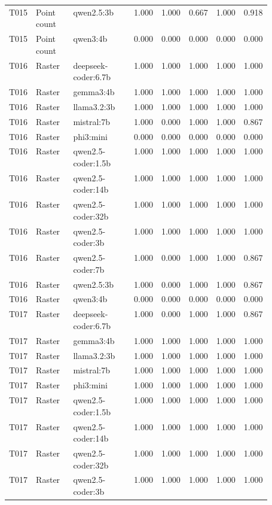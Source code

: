 \begin{longtable}{p{0.08\linewidth}p{0.16\linewidth}p{0.27\linewidth}rrrrr}
T015 & Point count & qwen2.5:3b & 1.000 & 1.000 & 0.667 & 1.000 & 0.918 \\
T015 & Point count & qwen3:4b & 0.000 & 0.000 & 0.000 & 0.000 & 0.000 \\
T016 & Raster & deepseek-coder:6.7b & 1.000 & 1.000 & 1.000 & 1.000 & 1.000 \\
T016 & Raster & gemma3:4b & 1.000 & 1.000 & 1.000 & 1.000 & 1.000 \\
T016 & Raster & llama3.2:3b & 1.000 & 1.000 & 1.000 & 1.000 & 1.000 \\
T016 & Raster & mistral:7b & 1.000 & 0.000 & 1.000 & 1.000 & 0.867 \\
T016 & Raster & phi3:mini & 0.000 & 0.000 & 0.000 & 0.000 & 0.000 \\
T016 & Raster & qwen2.5-coder:1.5b & 1.000 & 1.000 & 1.000 & 1.000 & 1.000 \\
T016 & Raster & qwen2.5-coder:14b & 1.000 & 1.000 & 1.000 & 1.000 & 1.000 \\
T016 & Raster & qwen2.5-coder:32b & 1.000 & 1.000 & 1.000 & 1.000 & 1.000 \\
T016 & Raster & qwen2.5-coder:3b & 1.000 & 1.000 & 1.000 & 1.000 & 1.000 \\
T016 & Raster & qwen2.5-coder:7b & 1.000 & 0.000 & 1.000 & 1.000 & 0.867 \\
T016 & Raster & qwen2.5:3b & 1.000 & 0.000 & 1.000 & 1.000 & 0.867 \\
T016 & Raster & qwen3:4b & 0.000 & 0.000 & 0.000 & 0.000 & 0.000 \\
T017 & Raster & deepseek-coder:6.7b & 1.000 & 0.000 & 1.000 & 1.000 & 0.867 \\
T017 & Raster & gemma3:4b & 1.000 & 1.000 & 1.000 & 1.000 & 1.000 \\
T017 & Raster & llama3.2:3b & 1.000 & 1.000 & 1.000 & 1.000 & 1.000 \\
T017 & Raster & mistral:7b & 1.000 & 1.000 & 1.000 & 1.000 & 1.000 \\
T017 & Raster & phi3:mini & 1.000 & 1.000 & 1.000 & 1.000 & 1.000 \\
T017 & Raster & qwen2.5-coder:1.5b & 1.000 & 1.000 & 1.000 & 1.000 & 1.000 \\
T017 & Raster & qwen2.5-coder:14b & 1.000 & 1.000 & 1.000 & 1.000 & 1.000 \\
T017 & Raster & qwen2.5-coder:32b & 1.000 & 1.000 & 1.000 & 1.000 & 1.000 \\
T017 & Raster & qwen2.5-coder:3b & 1.000 & 1.000 & 1.000 & 1.000 & 1.000 \\

\end{longtable}
